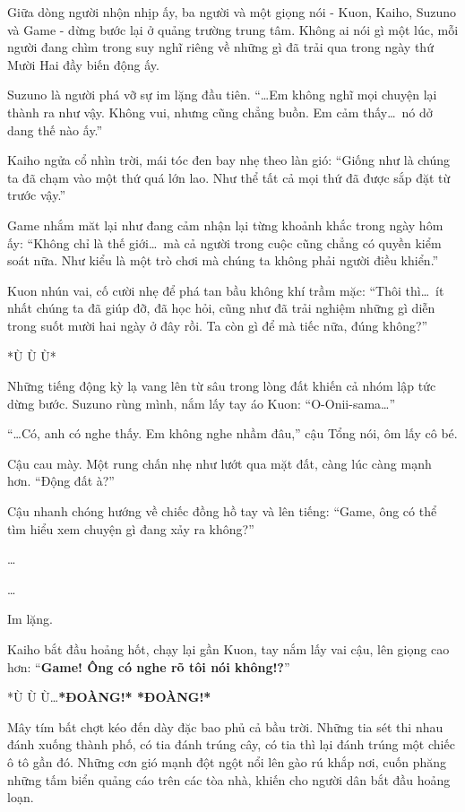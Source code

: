 \documentclass[../main.tex]{subfiles}
\begin{document}
Giữa dòng người nhộn nhịp ấy, ba người và một giọng nói - Kuon, Kaiho, Suzuno và Game - dừng bước lại ở quảng trường trung tâm. Không ai nói gì một lúc, mỗi người đang chìm trong suy nghĩ riêng về những gì đã trải qua trong ngày thứ Mười Hai đầy biến động ấy.

Suzuno là người phá vỡ sự im lặng đầu tiên. ``\dots Em không nghĩ mọi chuyện lại thành ra như vậy. Không vui, nhưng cũng chẳng buồn. Em cảm thấy\dots\ nó dở dang thế nào ấy.''

Kaiho ngửa cổ nhìn trời, mái tóc đen bay nhẹ theo làn gió: ``Giống như là chúng ta đã chạm vào một thứ quá lớn lao. Như thể tất cả mọi thứ đã được sắp đặt từ trước vậy.''

Game nhắm măt lại như đang cảm nhận lại từng khoảnh khắc trong ngày hôm ấy: ``Không chỉ là thế giới\dots\ mà cả người trong cuộc cũng chẳng có quyền kiểm soát nữa. Như kiểu là một trò chơi mà chúng ta không phải người điều khiển.''

Kuon nhún vai, cố cười nhẹ để phá tan bầu không khí trầm mặc: ``Thôi thì\dots\ ít nhất chúng ta đã giúp đỡ, đã học hỏi, cũng như đã trải nghiệm những gì diễn trong suốt mười hai ngày ở đây rồi. Ta còn gì để mà tiếc nữa, đúng không?''

*Ù Ù Ù*

Những tiếng động kỳ lạ vang lên từ sâu trong lòng đất khiến cả nhóm lập tức dừng bước. Suzuno rùng mình, nắm lấy tay áo Kuon: ``O-Onii-sama\dots''

``\dots Có, anh có nghe thấy. Em không nghe nhầm đâu,'' cậu Tổng nói, ôm lấy cô bé.

Cậu cau mày. Một rung chấn nhẹ như lướt qua mặt đất, càng lúc càng mạnh hơn. ``Động đất à?''

Cậu nhanh chóng hướng về chiếc đồng hồ tay và lên tiếng: ``Game, ông có thể tìm hiểu xem chuyện gì đang xảy ra không?''

\dots

\dots

Im lặng.

Kaiho bắt đầu hoảng hốt, chạy lại gần Kuon, tay nắm lấy vai cậu, lên giọng cao hơn: ``\textbf{Game! Ông có nghe rõ tôi nói không!?}''

*Ù Ù Ù\dots* \textbf{*ĐOÀNG!* *ĐOÀNG!*}

Mây tím bất chợt kéo đến dày đặc bao phủ cả bầu trời. Những tia sét thi nhau đánh xuống thành phố, có tia đánh trúng cây, có tia thì lại đánh trúng một chiếc ô tô gần đó. Những cơn gió mạnh đột ngột nổi lên gào rú khắp nơi, cuốn phăng những tấm biển quảng cáo trên các tòa nhà, khiến cho người dân bắt đầu hoảng loạn.
\end{document}
